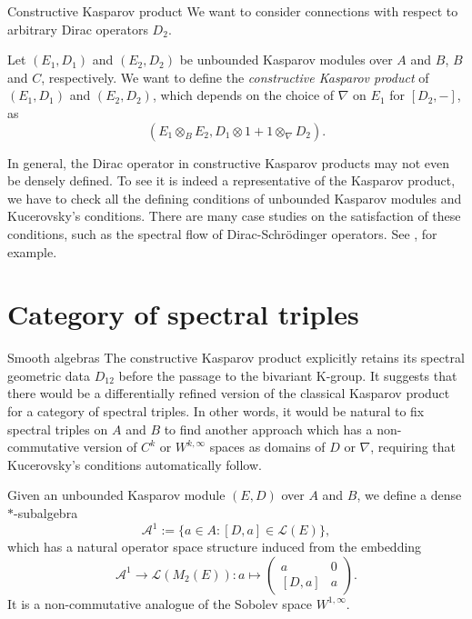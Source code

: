 \documentclass[handout]{../../../slide}
\begin{document}
\begin{frame}{Constructive Kasparov product}
We want to consider connections with respect to arbitrary Dirac operators $D_2$.
\begin{defn}
Let $(E_1,D_1)$ and $(E_2,D_2)$ be unbounded Kasparov modules over $A$ and $B$, $B$ and $C$, respectively.
We want to define the \emph{constructive Kasparov product} of $(E_1,D_1)$ and $(E_2,D_2)$, which depends on the choice of $\nabla$ on $E_1$ for $[D_2,-]$, as
\[(E_1\otimes_BE_2,D_1\otimes1+1\otimes_\nabla D_2).\]
\end{defn}
In general, the Dirac operator in constructive Kasparov products may not even be densely defined.
To see it is indeed a representative of the Kasparov product, we have to check all the defining conditions of unbounded Kasparov modules and Kucerovsky's conditions.
There are many case studies on the satisfaction of these conditions, such as the spectral flow of Dirac-Schr\"odinger operators.
See \cite{MR3107519}, \cite{MR3514936} for example.
\end{frame}



\section{Category of spectral triples}
\contents


\begin{frame}{Smooth algebras}
The constructive Kasparov product explicitly retains its spectral geometric data $D_{12}$ before the passage to the bivariant K-group.
It suggests that there would be a differentially refined version of the classical Kasparov product for a category of spectral triples.
\pause
In other words, it would be natural to fix spectral triples on $A$ and $B$ to find another approach which has a non-commutative version of $C^k$ or $W^{k,\infty}$ spaces as domains of $D$ or $\nabla$, requiring that Kucerovsky's conditions automatically follow.
\pause
\begin{defn}[\cite{MR3213549}]
Given an unbounded Kasparov module $(E,D)$ over $A$ and $B$, we define a dense $*$-subalgebra
\[\mathcal{A}^1:=\{a\in A:[D,a]\in\mathcal{L}(E)\},\]
which has a natural operator space structure induced from the embedding
\[\mathcal{A}^1\to\mathcal{L}(M_2(E)):a\mapsto\begin{pmatrix}a&0\\\left[D,a\right]&a\end{pmatrix}.\]
It is a non-commutative analogue of the Sobolev space $W^{1,\infty}$.
\end{defn}
\end{frame}
\end{document}
